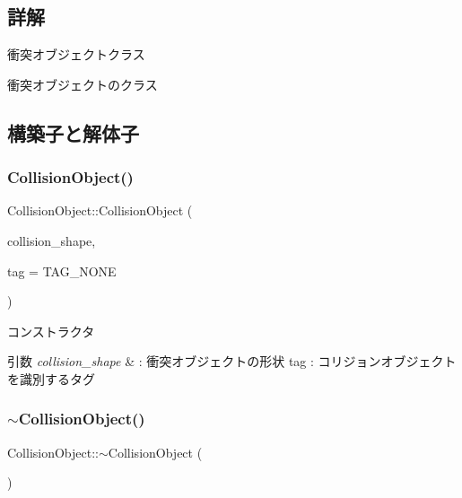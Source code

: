\subsection{詳解}
衝突オブジェクトクラス 

衝突オブジェクトのクラス 

\subsection{構築子と解体子}
\mbox{\label{class_collision_object_a6f502c16aaae1dc1470107a930f28808}} 
\subsubsection{\texorpdfstring{Collision\+Object()}{CollisionObject()}}
{\footnotesize\ttfamily Collision\+Object\+::\+Collision\+Object (\begin{DoxyParamCaption}\item[{\mbox{\hyperlink{class_collision_shape_base}{Collision\+Shape\+Base}} $\ast$}]{collision\+\_\+shape,  }\item[{int}]{tag = {\ttfamily TAG\+\_\+NONE} }\end{DoxyParamCaption})}



コンストラクタ 


\begin{DoxyParams}{引数}
{\em collision\+\_\+shape} & \+: 衝突オブジェクトの形状 tag \+: コリジョンオブジェクトを識別するタグ \\
\hline
\end{DoxyParams}
\mbox{\label{class_collision_object_a8c4e6916bc5911b8a82498536d5a27e1}} 
\subsubsection{\texorpdfstring{$\sim$\+Collision\+Object()}{~CollisionObject()}}
{\footnotesize\ttfamily Collision\+Object\+::$\sim$\+Collision\+Object (\begin{DoxyParamCaption}{ }\end{DoxyParamCaption})}



